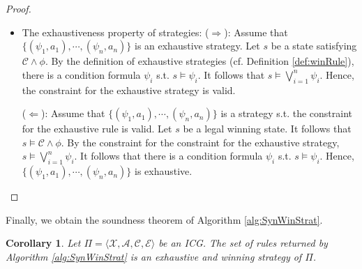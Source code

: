 \documentclass[review]{elsarticle}
\newcommand{\set}[1]{\{ #1 \}}
\newcommand{\tuple}[1]{\langle {#1} \rangle}
\newcommand{\statevar}{\mathcal{X}}
\newcommand{\act}{\mathcal{A}}
\newcommand{\constraint}{\mathcal{C}}
\newcommand{\estate}{\mathcal{E}}
\newtheorem{corollary}{Corollary}
\begin{document}
\begin{proof}
\begin{itemize}
		\item The exhaustiveness property of strategies: ($\Rightarrow$): Assume that $\set{(\psi_1, a_1), \cdots, (\psi_n, a_n)}$ is an exhaustive strategy.
		Let $s$ be a state satisfying $\constraint \land \phi$.
		By the definition of exhaustive strategies (cf. Definition \ref{def:winRule}), there is a condition formula $\psi_i$ s.t. $s \models \psi_i$.
		It follows that $s \models \bigvee_{i = 1}^n \psi_i$.
		Hence, the constraint for the exhaustive strategy is valid.
				
		
		($\Leftarrow$): Assume that $\set{(\psi_1, a_1), \cdots, (\psi_n, a_n)}$ is a strategy s.t. the constraint for the exhaustive rule is valid.
		Let $s$ be a legal winning state. %
		It follows that $s \models \constraint \land \phi$.
		By the constraint for the constraint for the exhaustive strategy, $s \models \bigvee_{i = 1}^n \psi_i$.
		It follows that there is a condition formula $\psi_i$ s.t. $s \models \psi_i$.	
		Hence, $\set{(\psi_1, a_1), \cdots, (\psi_n, a_n)}$ is exhaustive.
	\end{itemize}
	
	
\end{proof}

Finally, we obtain the soundness theorem of Algorithm \ref{alg:SynWinStrat}.

\begin{corollary} \label{cor:winStr}
	Let $\Pi = \tuple{\statevar, \act, \constraint, \estate}$ be an ICG.
	The set of rules returned by Algorithm \ref{alg:SynWinStrat} is an exhaustive and winning strategy of $\Pi$.
\end{corollary}
\end{document}
